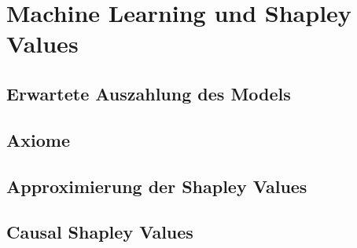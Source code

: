 \chapter{Machine Learning und Shapley Values}


\section{Erwartete Auszahlung des Models}
\section{Axiome}
\section{Approximierung der Shapley Values}
\section{Causal Shapley Values}